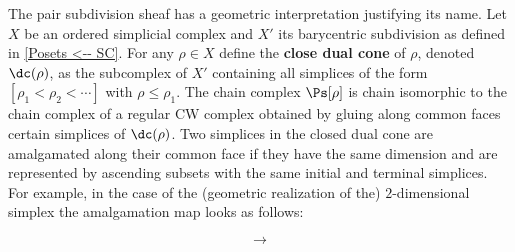 \documentclass[main.tex]{subfiles}
\begin{document}
\begin{remark}\label{pair subdivision related to dual cones}
The pair subdivision sheaf has a geometric interpretation justifying its name. Let $X$ be an ordered simplicial complex and $X'$ its barycentric subdivision as defined in \ref{Posets <-- SC}. For any $\rho\in X$ define the \textbf{close dual cone} of $\rho$, denoted $\dc(\rho)$, as the subcomplex of $X'$ containing all simplices of the form $[\rho_1<\rho_2<\dotsb]$ with $\rho\leq\rho_1$. The chain complex $\Ps[\rho]$ is chain isomorphic to the chain complex of a regular CW complex obtained by gluing along common faces certain simplices of $\dc(\rho)$. Two simplices in the closed dual cone are amalgamated along their common face if they have the same dimension and are represented by ascending subsets with the same initial and terminal simplices. For example, in the case of the (geometric realization of the) $2$-dimensional simplex the amalgamation map looks as follows:\vspace*{0pt}

\begin{minipage}{6cm}
\begin{center}\hspace*{3cm}
\end{center}
\end{minipage}
\begin{minipage}{1cm}
\vspace*{-.6cm}$$\longrightarrow$$
\end{minipage}
\begin{minipage}{6cm}
    \begin{center}
    \hspace*{3.2cm}
\end{center}
\end{minipage}\vspace*{10pt}


\end{remark}
\end{document}
